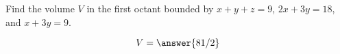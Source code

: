 \documentclass{ximera}
\author{David Guichard \and Neal Koblitz \and H. Jerome Keisler \and Albert Scheller \and Barry Balof \and Mike Wills \and Matthew Carr}
\begin{document}
\begin{exercise}




Find the volume $V$ in the first octant bounded by $x+y+z=9$, $2x+3y=18$, and $x+3y=9$.
\begin{prompt}
\[
V=\answer{81/2}
\]
\end{prompt}



\end{exercise}
\end{document}
